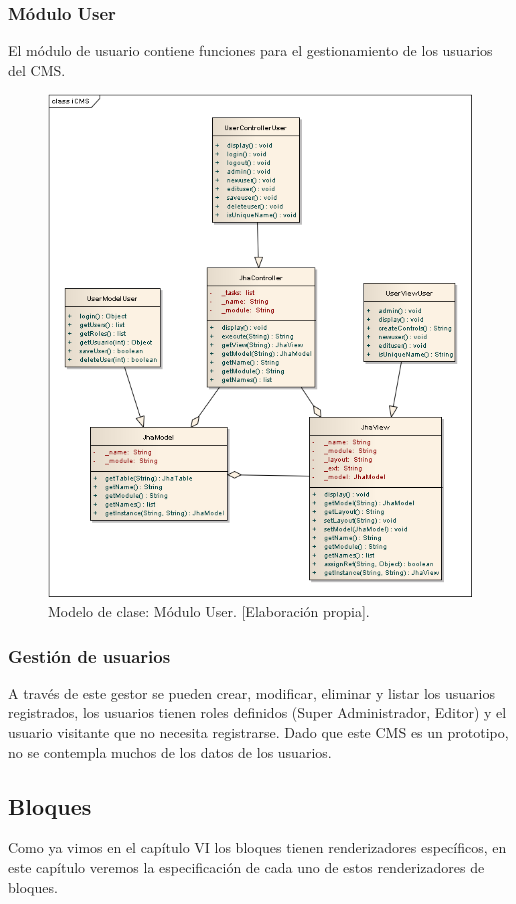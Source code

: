 \subsubsection{M\'odulo User}
El m\'odulo de usuario contiene funciones para el gestionamiento de los usuarios del CMS.

\begin{figure}[h]
\centering
\includegraphics[scale=.4, keepaspectratio=true]{imagenes/16_imagen.png}
\caption{Modelo de clase: M\'odulo User. [Elaboraci\'on propia].}
\end{figure}

\subsubsection{Gesti\'on de usuarios}
A trav\'es de este gestor se pueden crear, modificar, eliminar y listar los usuarios registrados, los usuarios tienen roles definidos (Super Administrador, Editor) y el usuario visitante que no necesita registrarse. Dado que este CMS es un prototipo, no se contempla muchos de los datos de los usuarios.

\subsection{Bloques}
Como ya vimos en el cap\'itulo VI los bloques tienen renderizadores espec\'ificos, en este cap\'itulo veremos la especificaci\'on de cada uno de estos renderizadores de bloques.

